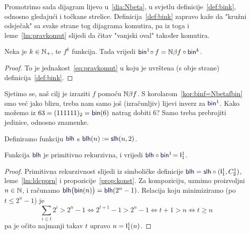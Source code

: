 
Promotrimo sada dijagram lijevo u~\eqref{dia:Nbeta}, u svjetlu definicije~\ref{def:bink}, odnosno gledajući i točkane strelice. Definicija~\ref{def:bink} zapravo kaže da "kružni odsječak" sa svake strane tog dijagrama komutira, pa iz toga i leme~\ref{lm:pravkomut} slijedi da čitav "\!vanjski oval" također komutira.

\begin{korolar}[{name=[brojevni-brojevni dijagram komutira]}]\label{kor:binf=Nbetafbin}
Neka je $k\in{\mathbb N}_+$, te $f^k$ funkcija. Tada vrijedi
    $\f{bin}^1\!\circ f=\N\beta f\circ\f{bin}^k$.
\end{korolar}
\begin{proof}
To je jednakost~\eqref{eq:pravkomut} u koju je uvrštena (s obje strane) definicija~\ref{def:bink}.
\end{proof}


Sjetimo se, naš cilj je izraziti $f$ pomoću ${\mathbb N}\beta f$. S korolarom~\ref{kor:binf=Nbetafbin} smo već jako blizu, treba nam samo još (izračunljiv) lijevi inverz za $\f{bin}^1$. Kako možemo iz $63=(111111)_2=\f{bin}(6)$ natrag dobiti $6$? Samo treba prebrojiti jedinice, odnosno znamenke.

\begin{lema}[{name=[primitivna rekurzivnost i specifikacija duljine binarnog zapisa]}]\label{lm:blh}
Definiramo funkciju $\f{blh}$ s $\f{blh}(n):=\f{slh}(n,2)$. 

Funkcija $\f{blh}$ je primitivno rekurzivna, i vrijedi $\f{blh}\circ\f{bin}^1\!=\f I_1^1$.
\end{lema}
\begin{proof}
Primitivna rekurzivnost slijedi iz simboličke definicije $\f{blh}=\f{slh}\circ(\f I_1^1,C_2^1)$, leme~\ref{lm:ldcpprn} i propozicije~\ref{prop:konst}.
Za kompoziciju, uzmimo proizvoljni $n\in{\mathbb N}$, i računamo $\f{blh}\bigl(\f{bin}(n)\bigr)=\f{blh}(2^n-1)$. Relacija koju minimiziramo (po $t\le 2^n-1$) je
\begin{equation}
    \textstyle\sum_{i\le t}2^i>2^n-1
    \Longleftrightarrow
    2^{t+1}-1>2^n-1
    \Longleftrightarrow
    t+1>n
    \Longleftrightarrow
    t\ge n
\end{equation}
pa je očito najmanji takav $t$ upravo $n=\f I_1^1(n)$.\qedhere
\end{proof}

